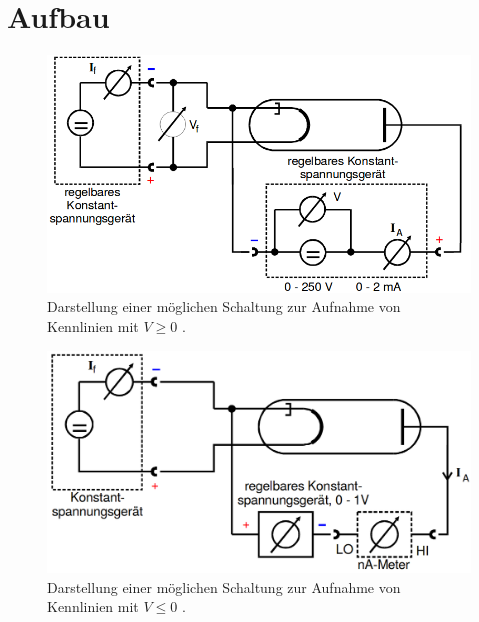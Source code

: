 \section{Aufbau}
\label{sec:Aufbau}
\begin{figure}
	\centering
	\includegraphics[width=\linewidth-100pt,height=\textheight-100pt,keepaspectratio]{content/Bilder/Schaltung1.png}
	\caption{Darstellung einer möglichen Schaltung zur Aufnahme von Kennlinien mit $V\ge0$ \cite{V504}.}
	\label{fig:Schaltung1}
\end{figure}
\begin{figure}
	\centering
	\includegraphics[width=\linewidth-100pt,height=\textheight-100pt,keepaspectratio]{content/Bilder/Schaltung2.png}
	\caption{Darstellung einer möglichen Schaltung zur Aufnahme von Kennlinien mit $V\le0$ \cite{V504}.}
	\label{fig:Schaltung2}
\end{figure}


